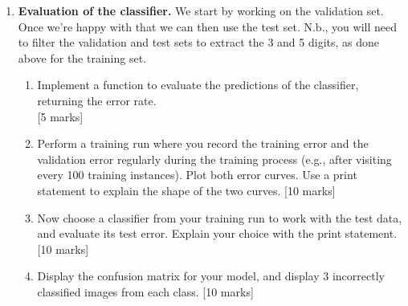 \documentclass{article}
\begin{document}
\begin{enumerate}
\item \textbf{Evaluation of the classifier.}
We start by working on the validation set. Once we're happy with that we can then use the test set. N.b., you will need to filter the validation and test sets to extract the 3 and 5 digits, as done above for the training set.
\begin{enumerate}
\item Implement a function to evaluate the predictions of the classifier, returning the error rate. \\ \mbox{} \hfill [5 marks]
\item Perform a training run where you record the training error and the validation error regularly during the training process (e.g., after visiting every 100 training instances). Plot both error curves. Use a print statement to explain the shape of the two curves. \hfill [10 marks]
\item Now choose a classifier from your training run to work with the test data, and evaluate its test error. Explain your choice with the print statement. \hfill [10 marks]
\item Display the confusion matrix for your model, and display 3 incorrectly classified images from each class. \hfill [10 marks]
\end{enumerate}


\end{enumerate}
\end{document}

